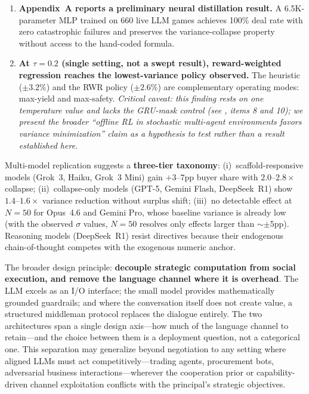 \documentclass[11pt,a4paper]{article}
\begin{document}
\begin{enumerate}
\item \textbf{Appendix~A reports a preliminary neural distillation result.} A 6.5K-parameter MLP trained on 660 live LLM games achieves 100\% deal rate with zero catastrophic failures and preserves the variance-collapse property without access to the hand-coded formula.
\item \textbf{At $\tau=0.2$ (single setting, not a swept result), reward-weighted regression reaches the lowest-variance policy observed.} The heuristic ($\pm 3.2\%$) and the RWR policy ($\pm 2.6\%$) are complementary operating modes: max-yield and max-safety. \emph{Critical caveat: this finding rests on one temperature value and lacks the GRU-mask control (see , items 8 and 10); we present the broader ``offline RL in stochastic multi-agent environments favors variance minimization'' claim as a hypothesis to test rather than a result established here.}
\end{enumerate}

Multi-model replication suggests a \textbf{three-tier taxonomy}: (i)~scaffold-responsive models (Grok~3, Haiku, Grok~3 Mini) gain $+3$--$7$pp buyer share with $2.0$--$2.8\times$ collapse; (ii)~collapse-only models (GPT-5, Gemini Flash, DeepSeek~R1) show $1.4$--$1.6\times$ variance reduction without surplus shift; (iii)~no detectable effect at $N\!=\!50$ for Opus~4.6 and Gemini Pro, whose baseline variance is already low (with the observed $\sigma$ values, $N\!=\!50$ resolves only effects larger than ${\sim}\pm 5$pp). Reasoning models (DeepSeek~R1) resist directives because their endogenous chain-of-thought competes with the exogenous numeric anchor.

The broader design principle: \textbf{decouple strategic computation from social execution, and remove the language channel where it is overhead}. The LLM excels as an I/O interface; the small model provides mathematically grounded guardrails; and where the conversation itself does not create value, a structured middleman protocol replaces the dialogue entirely. The two architectures span a single design axis---how much of the language channel to retain---and the choice between them is a deployment question, not a categorical one. This separation may generalize beyond negotiation to any setting where aligned LLMs must act competitively---trading agents, procurement bots, adversarial business interactions---wherever the cooperation prior or capability-driven channel exploitation conflicts with the principal's strategic objectives.
\end{document}

